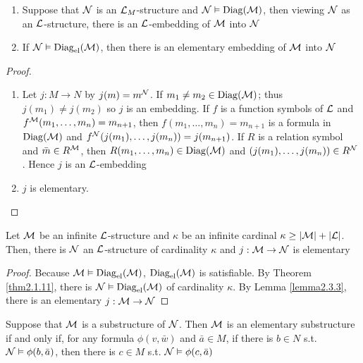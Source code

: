 \documentclass[11pt]{article}
\begin{document}
\begin{lemma}[]
\label{lemma2.3.3}
\begin{enumerate}
\item Suppose that \(\mathcal{N}\) is an \(\mathcal{L}_M\)-structure and
\(\mathcal{N}\vDash\operatorname{Diag}(\mathcal{M})\), then viewing \(\mathcal{N}\) as an
\(\mathcal{L}\)-structure, there is an \(\mathcal{L}\)-embedding of \(\mathcal{M}\) into \(\mathcal{N}\)
\item If \(\mathcal{N}\vDash\operatorname{Diag}_{\operatorname{el}}(\mathcal{M})\), then there is an elementary
embedding of \(\mathcal{M}\) into \(\mathcal{N}\)
\end{enumerate}
\end{lemma}

\begin{proof}
\begin{enumerate}
\item Let \(j:M\to N\) by \(j(m)=m^{\mathcal{N}}\). If \(m_1\neq m_2\in\operatorname{Diag}(\mathcal{M})\);
thus \(j(m_1)\neq j(m_2)\) so \(j\) is an embedding. If \(f\) is a function
symbols of \(\mathcal{L}\) and \(f^{\mathcal{M}}(m_1,\dots,m_n)=m_{n+1}\), then
\(f(m_1,\dots,m_n)=m_{n+1}\) is a formula in \(\operatorname{Diag}(\mathcal{M})\) and 
\(f^{\mathcal{N}}(j(m_1),\dots,j(m_n))=j(m_{n+1})\). If \(R\) is a relation symbol
and \(\bar{m}\in R^{\mathcal{M}}\), then \(R(m_1,\dots,m_n)\in\operatorname{Diag}(\mathcal{M})\) and 
\((j(m_1),\dots,j(m_{n}))\in R^{\mathcal{N}}\). Hence \(j\) is an
\(\mathcal{L}\)-embedding
\item \(j\) is elementary.
\end{enumerate}
\end{proof}

\begin{theorem}
Let \(\mathcal{M}\) be an infinite \(\mathcal{L}\)-structure and \(\kappa\) be an infinite
cardinal \(\kappa\ge\abs{\calm}+\abs{\call}\). Then, there is \(\mathcal{N}\) an
\(\mathcal{L}\)-structure of cardinality \(\kappa\) and \(j:\mathcal{M}\to\mathcal{N}\) is elementary
\end{theorem}

\begin{proof}
Because \(\mathcal{M}\vDash\operatorname{Diag}_{\operatorname{el}}(\mathcal{M})\), \(\operatorname{Diag}_{\operatorname{el}}(\mathcal{M})\) is
satisfiable. By Theorem \ref{thm2.1.11}, there is
\(\mathcal{N}\vDash\operatorname{Diag}_{\operatorname{el}}(\mathcal{M})\) of cardinality \(\kappa\). By Lemma \ref{lemma2.3.3},
there is an elementary \(j:\mathcal{M}\to\mathcal{N}\)
\end{proof}

\begin{proposition}
\label{prop2.3.5}
Suppose that \(\mathcal{M}\) is a substructure of \(\mathcal{N}\). Then \(\mathcal{M}\) is an
elementary substructure if and only if, for any formula \(\phi(v,\bar{w})\) and 
\(\bar{a}\in M\), if there is \(b\in N\) s.t.
\(\mathcal{N}\vDash\phi(b,\bar{a})\), then there is \(c\in M\) s.t.
\(\mathcal{N}\vDash\phi(c,\bar{a})\) 
\end{proposition}
\end{document}

